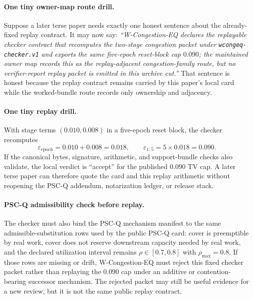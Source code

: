 \documentclass[11pt]{article}
\newcommand{\eps}{\varepsilon}
\begin{document}
\paragraph{One tiny owner-map route drill.}
Suppose a later terse paper needs exactly one honest sentence about the already-fixed replay contract. It may now say: \emph{``W-Congestion-EQ declares the replayable checker contract that recomputes the two-stage congestion packet under \nolinkurl{wcongeq-checker.v1} and exports the same five-epoch reset-block cap $0.090$; the maintained owner map records this as the replay-adjacent congestion-family route, but no verifier-report replay packet is emitted in this archive cut.''}
That sentence is honest because the replay contract remains carried by this paper's local card while the worked-bundle route records only ownership and adjacency.

\paragraph{One tiny replay drill.}
With stage terms $(0.010,0.008)$ in a five-epoch reset block, the checker recomputes
\[
\eps_{\mathrm{epoch}} = 0.010+0.008 = 0.018,
\qquad
\eps_{1:5} = 5\times 0.018 = 0.090.
\]
If the canonical bytes, signature, arithmetic, and support-bundle checks also validate, the local verdict is ``accept'' for the published $0.090$ TV cap. A later terse paper can therefore quote the card and this replay arithmetic without reopening the PSC-Q addendum, notarization ledger, or release stack.

\paragraph{PSC-Q admissibility check before replay.}
The checker must also bind the PSC-Q mechanism manifest to the same admissible-substitution rows used by the public PSC-Q card: cover is preemptible by real work, cover does not reserve downstream capacity needed by real work, and the declared utilization interval remains $\rho\in[0.7,0.8]$ with $\rho_{\max}=0.8$.  If those rows are missing or drift, W-Congestion-EQ must reject this fixed checker packet rather than replaying the $0.090$ cap under an additive or contention-bearing successor mechanism.  The rejected packet may still be useful evidence for a new review, but it is not the same public replay contract.
\end{document}
